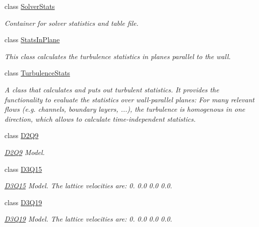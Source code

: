 \begin{DoxyCompactItemize}
class \hyperlink{classnatrium_1_1SolverStats}{SolverStats}
\begin{DoxyCompactList}\small\item\em Container for solver statistics and table file. \item\end{DoxyCompactList}\item 
class \hyperlink{classnatrium_1_1StatsInPlane}{StatsInPlane}
\begin{DoxyCompactList}\small\item\em This class calculates the turbulence statistics in planes parallel to the wall. \item\end{DoxyCompactList}\item 
class \hyperlink{classnatrium_1_1TurbulenceStats}{TurbulenceStats}
\begin{DoxyCompactList}\small\item\em A class that calculates and puts out turbulent statistics. It provides the functionality to evaluate the statistics over wall-\/parallel planes: For many relevant flows (e.g. channels, boundary layers, ...), the turbulence is homogenous in one direction, which allows to calculate time-\/independent statistics. \item\end{DoxyCompactList}\item 
class \hyperlink{classnatrium_1_1D2Q9}{D2Q9}
\begin{DoxyCompactList}\small\item\em \hyperlink{classnatrium_1_1D2Q9}{D2Q9} Model. \item\end{DoxyCompactList}\item 
class \hyperlink{classnatrium_1_1D3Q15}{D3Q15}
\begin{DoxyCompactList}\small\item\em \hyperlink{classnatrium_1_1D3Q15}{D3Q15} Model. The lattice velocities are: 0. 0.0 0.0 0.0. \item\end{DoxyCompactList}\item 
class \hyperlink{classnatrium_1_1D3Q19}{D3Q19}
\begin{DoxyCompactList}\small\item\em \hyperlink{classnatrium_1_1D3Q19}{D3Q19} Model. The lattice velocities are: 0. 0.0 0.0 0.0. \item\end{DoxyCompactList}\item 

\end{DoxyCompactItemize}

